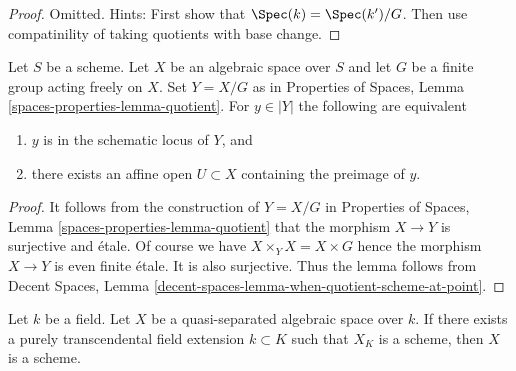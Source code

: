 \begin{proof}
Omitted. Hints: First show that $\Spec(k) = \Spec(k')/G$.
Then use compatinility of taking quotients with base change.
\end{proof}

\begin{lemma}
\label{lemma-when-quotient-scheme-at-point}
Let $S$ be a scheme. Let $X$ be an algebraic space over $S$ and
let $G$ be a finite group acting freely on $X$. Set $Y = X/G$ as
in Properties of Spaces, Lemma \ref{spaces-properties-lemma-quotient}.
For $y \in |Y|$ the following are equivalent
\begin{enumerate}
\item $y$ is in the schematic locus of $Y$, and
\item there exists an affine open $U \subset X$
containing the preimage of $y$.
\end{enumerate}
\end{lemma}

\begin{proof}
It follows from the construction of $Y = X/G$ in
Properties of Spaces, Lemma \ref{spaces-properties-lemma-quotient}
that the morphism $X \to Y$ is surjective and \'etale.
Of course we have $X \times_Y X = X \times G$ hence the morphism
$X \to Y$ is even finite \'etale. It is also surjective.
Thus the lemma follows from
Decent Spaces, Lemma \ref{decent-spaces-lemma-when-quotient-scheme-at-point}.
\end{proof}

\begin{lemma}
\label{lemma-scheme-after-purely-transcendental-base-change}
Let $k$ be a field. Let $X$ be a quasi-separated
algebraic space over $k$. If there exists a purely transcendental
field extension $k \subset K$ such that $X_K$ is a scheme, then
$X$ is a scheme.
\end{lemma}

